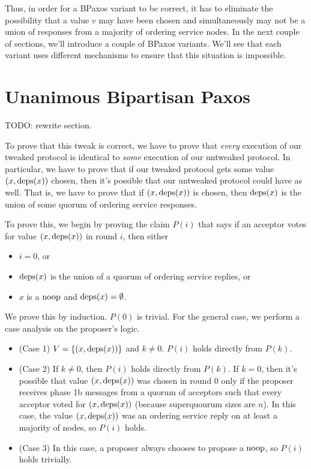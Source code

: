 \documentclass{mwhittaker}
\begin{document}
Thus, in order for a BPaxos variant to be correct, it has to eliminate the
possibility that a value $v$ may have been chosen and simultaneously may not be
a union of responses from a majority of ordering service nodes. In the next
couple of sections, we'll introduce a couple of BPaxos variants. We'll see that
each variant uses different mechanisms to ensure that this situation is
impossible.

\section{Unanimous Bipartisan Paxos}
TODO: rewrite section.

To prove that this tweak is correct, we have to prove that \emph{every}
execution of our tweaked protocol is identical to \emph{some} execution of our
untweaked protocol. In particular, we have to prove that if our tweaked
protocol gets some value $(x, \text{deps}(x))$ chosen, then it's possible that our
untweaked protocol could have as well. That is, we have to prove that if $(x,
\text{deps}(x))$ is chosen, then $\text{deps}(x)$ is the union of some quorum of ordering
service responses.

To prove this, we begin by proving the claim $P(i)$ that says if an acceptor
votes for value $(x, \text{deps}(x))$ in round $i$, then either
\begin{itemize}
  \item $i = 0$, or
  \item $\text{deps}(x)$ is the union of a quorum of ordering service replies, or
  \item $x$ is a $\text{noop}$ and $\text{deps}(x) = \emptyset{}$.
\end{itemize}
We prove this by induction. $P(0)$ is trivial. For the general case, we perform
a case analysis on the proposer's logic.
\begin{itemize}
  \item (Case 1)
    $V = \{(x, \text{deps}(x))\}$ and $k \neq 0$. $P(i)$ holds directly from
    $P(k)$.

  \item (Case 2)
    If $k \neq 0$, then $P(i)$ holds directly from $P(k)$. If $k = 0$, then
    it's possible that value $(x, \text{deps}(x))$ was chosen in round $0$ only if
    the proposer receives phase 1b messages from a quorum of acceptors such
    that every acceptor voted for $(x, \text{deps}(x))$ (because superquourum sizes
    are $n$). In this case, the value $(x, \text{deps}(x))$ was an ordering service
    reply on at least a majority of nodes, so $P(i)$ holds.

  \item (Case 3)
    In this case, a proposer always chooses to propose a $\text{noop}$, so $P(i)$
    holds trivially.
\end{itemize}
\end{document}
